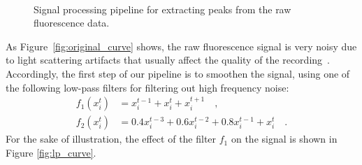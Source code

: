 \documentclass[wcp]{jmlr}
\begin{document}
\begin{figure}
\centering
{}
\\
\caption{Signal processing pipeline for extracting peaks from the raw fluorescence data.}
\label{fig:filtered-signal}
\end{figure}

As Figure~\ref{fig:original_curve} shows, the raw
fluorescence signal is very noisy due to light scattering artifacts that
usually affect the quality of the recording~\citep{lichtman2011big}.
Accordingly, the first step of our pipeline is to smoothen the signal, using
one of the following low-pass filters for filtering out high frequency noise:
\begin{align}
f_1(x^t_i) &= x^{t-1}_i + x^t_i + x^{t+1}_i\quad, \label{eq:symetric-median} \\
f_2(x^t_i) &= 0.4 x^{t-3}_i + 0.6 x^{t-2}_i + 0.8 x^{t-1}_i + x_i^t\quad.
\label{eq:weighted-asymetric-median}
\end{align}
For the sake of illustration, the effect of the filter $f_1$ on the signal
is shown in Figure \ref{fig:lp_curve}.
\end{document}
